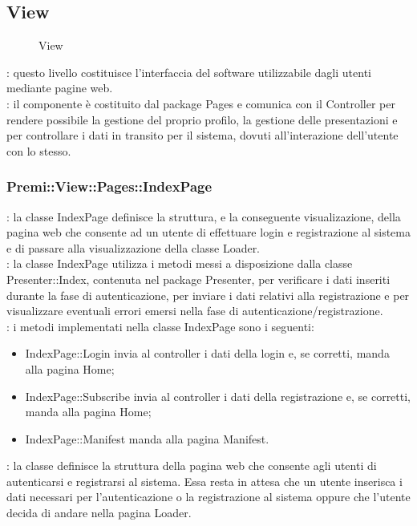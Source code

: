 	\subsection{View}{
		\begin{figure}[h]
			\centering
			\label{fig:view}
			\caption{View}
		\end{figure}
		\textbf{\tipo}: questo livello costituisce l'interfaccia del software utilizzabile dagli utenti mediante pagine web.\\
		\textbf{\relaz}: il componente è costituito dal package Pages e comunica con il Controller per rendere possibile la gestione del proprio profilo, la gestione delle presentazioni e per controllare i dati in transito per il sistema, dovuti all'interazione dell'utente con lo stesso.\\
		
		\subsubsection{Premi::View::Pages::IndexPage}{
			\textbf{\tipo}: la classe IndexPage definisce la struttura, e la conseguente visualizazione, della pagina web che consente ad un utente di effettuare login e registrazione al sistema e di passare alla visualizzazione della classe Loader.\\
			\textbf{\relaz}: la classe IndexPage utilizza i metodi messi a disposizione dalla classe Presenter::Index, contenuta nel package Presenter, per verificare i dati inseriti durante la fase di autenticazione, per inviare i dati relativi alla registrazione e per visualizzare eventuali errori emersi nella fase di autenticazione/registrazione.\\
			\textbf{\interfacce}: i metodi implementati nella classe IndexPage sono i seguenti:
			\begin{itemize}
				\item IndexPage::Login invia al controller i dati della login e, se corretti, manda alla pagina Home;
				\item IndexPage::Subscribe invia al controller i dati della registrazione e, se corretti, manda alla pagina Home;
				\item IndexPage::Manifest manda alla pagina Manifest.
			\end{itemize} 
			\textbf{\attivita}: la classe definisce la struttura della pagina web che consente agli utenti di autenticarsi e registrarsi al sistema. Essa resta in attesa che un utente inserisca i dati necessari per l’autenticazione o la registrazione al sistema oppure che l'utente decida di andare nella pagina Loader.\\
		}
}
